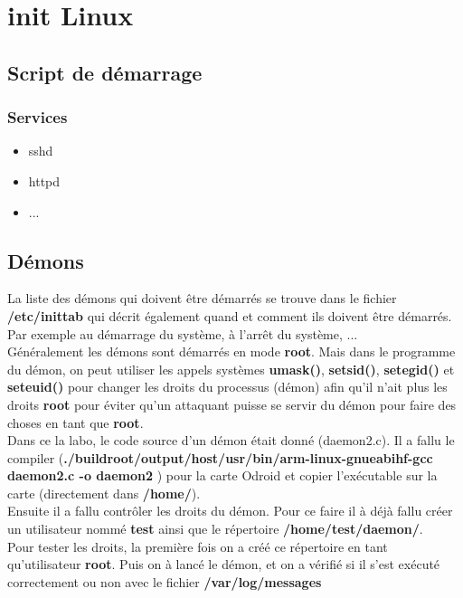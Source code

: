 \chapter{init Linux}
\section{Script de démarrage}
\subsection{Services}
\begin{itemize}
	\item sshd
	\item httpd
	\item ...
\end{itemize}

\section{Démons}
La liste des démons qui doivent être démarrés se trouve dans le fichier \textbf{/etc/inittab} qui décrit également quand et comment ils doivent être démarrés. Par exemple au démarrage du système, à l'arrêt du système, ...\\

Généralement les démons sont démarrés en mode \textbf{root}. Mais dans le programme du démon, on peut utiliser les appels systèmes \textbf{umask()}, \textbf{setsid()}, \textbf{setegid()} et \textbf{seteuid()} pour changer les droits du processus (démon) afin qu'il n'ait plus les droits \textbf{root} pour éviter qu'un attaquant puisse se servir du démon pour faire des choses en tant que \textbf{root}. \\

Dans ce la labo, le code source d'un démon était donné (daemon2.c). Il a fallu le compiler (\textbf{./buildroot/output/host/usr/bin/arm-linux-gnueabihf-gcc daemon2.c -o daemon2}
) pour la carte Odroid et copier l'exécutable sur la carte (directement dans \textbf{/home/}). \\

Ensuite il a fallu contrôler les droits du démon. Pour ce faire il à déjà fallu créer un utilisateur nommé \textbf{test} ainsi que le répertoire \textbf{/home/test/daemon/}.\\

Pour tester les droits, la première fois on a créé ce répertoire en tant qu'utilisateur \textbf{root}. Puis on à lancé le démon, et on a vérifié si il s'est exécuté correctement ou non avec le fichier \textbf{/var/log/messages}

